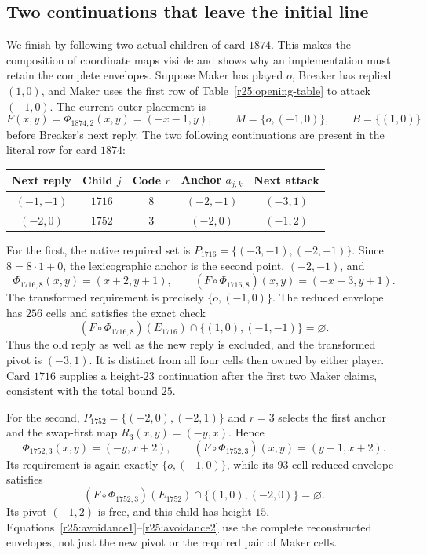 \subsection{Two continuations that leave the initial line}
\label{r25:nonlocal}

We finish by following two actual children of card $1874$.  This
makes the composition of coordinate maps visible and shows why an
implementation must retain the complete envelopes.  Suppose Maker
has played $o$, Breaker has replied $(1,0)$, and Maker uses the first
row of Table~\ref{r25:opening-table} to attack $(-1,0)$.  The current
outer placement is
\[
 F(x,y)=\Phi_{1874,2}(x,y)=(-x-1,y),
 \qquad M=\{o,(-1,0)\},\qquad B=\{(1,0)\}
\]
before Breaker's next reply.  The two following continuations are
present in the literal row for card $1874$:
\begin{center}
\begin{tabular}{ccccc}
\toprule
Next reply&Child $j$&Code $r$&Anchor $a_{j,k}$&Next attack\\
\midrule
$(-1,-1)$&$1716$&$8$&$(-2,-1)$&$(-3,1)$\\
$(-2,0)$&$1752$&$3$&$(-2,0)$&$(-1,2)$\\
\bottomrule
\end{tabular}
\end{center}

For the first, the native required set is
$P_{1716}=\{(-3,-1),(-2,-1)\}$.  Since $8=8\cdot1+0$, the
lexicographic anchor is the second point, $(-2,-1)$, and
\[
 \Phi_{1716,8}(x,y)=(x+2,y+1),\qquad
 (F\circ\Phi_{1716,8})(x,y)=(-x-3,y+1).
\]
The transformed requirement is precisely $\{o,(-1,0)\}$.
The reduced envelope has $256$ cells and satisfies the exact check
\begin{equation}\label{r25:avoidance1}
 (F\circ\Phi_{1716,8})(E_{1716})
       \cap\{(1,0),(-1,-1)\}=\varnothing.
\end{equation}
Thus the old reply as well as the new reply is excluded, and the
transformed pivot is $(-3,1)$.  It is distinct from all four cells
then owned by either player.  Card $1716$ supplies a height-$23$
continuation after the first two Maker claims, consistent with the
total bound $25$.

For the second, $P_{1752}=\{(-2,0),(-2,1)\}$ and $r=3$ selects
the first anchor and the swap-first map $R_3(x,y)=(-y,x)$.  Hence
\[
 \Phi_{1752,3}(x,y)=(-y,x+2),\qquad
 (F\circ\Phi_{1752,3})(x,y)=(y-1,x+2).
\]
Its requirement is again exactly $\{o,(-1,0)\}$, while its
$93$-cell reduced envelope satisfies
\begin{equation}\label{r25:avoidance2}
 (F\circ\Phi_{1752,3})(E_{1752})
       \cap\{(1,0),(-2,0)\}=\varnothing.
\end{equation}
Its pivot $(-1,2)$ is free, and this child has height $15$.
Equations~\eqref{r25:avoidance1}--\eqref{r25:avoidance2} use the
complete reconstructed envelopes, not just the new pivot or the
required pair of Maker cells.

